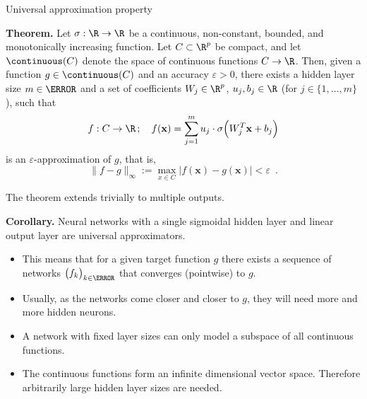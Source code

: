 \begin{vbframe}{Universal approximation property}

  \textbf{Theorem.}
  Let $\sigma : \R \to \R$ be a continuous, non-constant, bounded, and
  monotonically increasing function. Let $C \subset \R^p$ be compact,
  and let $\continuous(C)$ denote the space of continuous functions $C \to \R$.
  Then, given a function $g \in \continuous(C)$ and an accuracy $\varepsilon > 0$,
  there exists a hidden layer size $m \in \N$ and a set of coefficients
  $W_j \in \R^p$, $u_j, b_j \in \R$
  (for $j \in \{1, \dots, m\}$), such that
  $$
    f : C \to \R \,;\quad f(\mathbf{x}) = \sum_{j=1}^m u_j \cdot \sigma \Big( W_j^T \mathbf{x} + b_j \Big)
  $$
  is an $\varepsilon$-approximation of $g$, that is,
  $$
    \|f - g\|_{\infty} := \max_{x \in C} |f(\mathbf{x}) - g(\mathbf{x})| < \varepsilon
    \enspace.
  $$

  The theorem extends trivially to multiple outputs.

  \framebreak

  \textbf{Corollary.}
  Neural networks with a single sigmoidal hidden layer and linear
  output layer are universal approximators.

  \begin{itemize}
    \item This means that for a given target function $g$ there exists a
    sequence of networks $\big( f_k \big)_{k \in \N}$ that converges
    (pointwise) to $g$.%
    \vspace{2mm}
    \item Usually, as the networks come closer and closer to $g$, they
    will need more and more hidden neurons.
    \vspace{2mm}
    \item A network with fixed layer sizes can only model a subspace of all
    continuous functions. %
    \vspace{2mm}
    \item The continuous functions form an infinite dimensional vector space.
    Therefore arbitrarily large hidden layer sizes are needed.
  \end{itemize}

  \framebreak


\end{vbframe}

